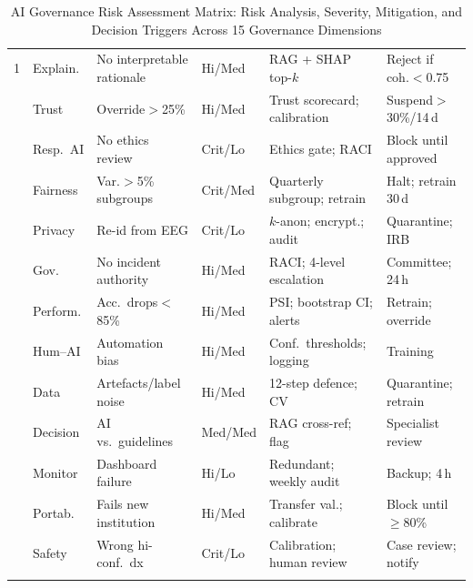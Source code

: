 \iffalse
\begin{table}[!htbp]
\tablestripes
\tablefontsize
\caption[AI Governance Risk Assessment Matrix]{AI Governance Risk Assessment Matrix: Risk Analysis, Severity, Mitigation, and Decision Triggers Across 15 Governance Dimensions}
\begin{tabularx}{\textwidth}{@{} p{0.4cm} >{\raggedright\arraybackslash}p{1.8cm} L >{\raggedright\arraybackslash}p{1.3cm} L L @{}}
\toprule
\thead{\#} &  &  &  &  &  \\
 & Explain. & No interpretable rationale & Hi/Med & RAG + SHAP top-$k$ & Reject if coh.$<$0.75 \\
 & Trust & Override$>$25\% & Hi/Med & Trust scorecard; calibration & Suspend$>$30\%/14\,d \\
 & Resp.\ AI & No ethics review & Crit/Lo & Ethics gate; RACI & Block until approved \\
 & Fairness & Var.$>$5\% subgroups & Crit/Med & Quarterly subgroup; retrain & Halt; retrain 30\,d \\
 & Privacy & Re-id from EEG & Crit/Lo & $k$-anon; encrypt.; audit & Quarantine; IRB \\
 & Gov. & No incident authority & Hi/Med & RACI; 4-level escalation & Committee; 24\,h \\
 & Perform. & Acc.\ drops$<$85\% & Hi/Med & PSI; bootstrap CI; alerts & Retrain; override \\
 & Hum--AI & Automation bias & Hi/Med & Conf.\ thresholds; logging & Training \\
 & Data & Artefacts/label noise & Hi/Med & 12-step defence; CV & Quarantine; retrain \\
 & Decision & AI vs.\ guidelines & Med/Med & RAG cross-ref; flag & Specialist review \\
 & Monitor & Dashboard failure & Hi/Lo & Redundant; weekly audit & Backup; 4\,h \\
 & Portab. & Fails new institution & Hi/Med & Transfer val.; calibrate & Block until$\geq$80\% \\
 & Safety & Wrong hi-conf.\ dx & Crit/Lo & Calibration; human review & Case review; notify \\
\addlinespace

\end{tabularx}
\end{table}
